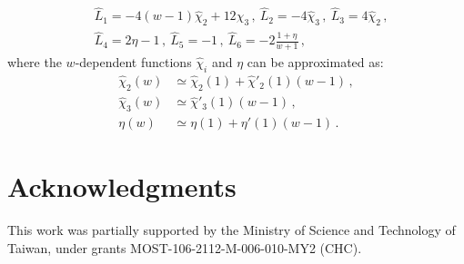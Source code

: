 \documentclass[prd,preprint,superscriptaddress,amsmath,amssymb]{revtex4}
\begin{document}
   \begin{align}
   &\hat L_1 = -4(w-1) \hat\chi_2 + 12 \hat \chi_3\,, \ \hat L_2 = -4 \hat\chi_3\,, \ \hat L_3 = 4 \hat\chi_2\,,  \nonumber \\
   & \hat L_4 = 2 \eta -1\,, \ \hat L_5= -1\,, \  \hat L_6 = -2 \frac{1+\eta}{w+1}\,,
   \end{align}
   where the $w$-dependent functions $\hat\chi_i$ and $\eta$ can be approximated as:
    \begin{align}
    \hat\chi_2 (w) & \simeq \hat\chi_2(1) + \hat\chi'_2(1) (w-1)\,, \nonumber \\
    \hat\chi_3(w) & \simeq \hat\chi'_3 (1) (w-1) \,, \nonumber \\
    \eta(w) & \simeq \eta(1) + \eta'(1)(w-1)\,.
    \end{align}
 

%
%
 
\section*{Acknowledgments}

This work was partially supported by the Ministry of Science and Technology of Taiwan,  
under grants MOST-106-2112-M-006-010-MY2 (CHC). \\
\end{document}
